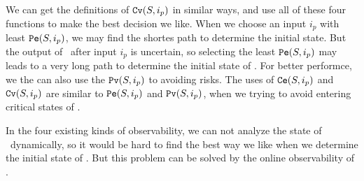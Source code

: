 We can get the definitions of ${\tt Cv}(S, i_p)$ in similar ways, and use all of these four functions to make the best decision we like. When we choose an input $i_p$ with least ${\tt Pe}(S, i_p)$, we may find the shortes path to determine the initial state. But the output of \BCNs\ after input $i_p$ is uncertain, so selecting the least ${\tt Pe}(S, i_p)$ may leads to a very long path to determine the initial state of \BCNs. For better performce, we the can also use the ${\tt Pv}(S, i_p)$ to avoiding risks. The uses of ${\tt Ce}(S, i_p)$ and ${\tt Cv}(S, i_p)$ are similar to ${\tt Pe}(S, i_p)$ and ${\tt Pv}(S, i_p)$, when we trying to avoid entering critical states of \BCNs.

In the four existing kinds of observability, we can not analyze the state of \BCNs\ dynamically, so it would be hard to find the best way we like when we determine the initial state of \BCNs. But this problem can be solved by the online observability of \BCNs.